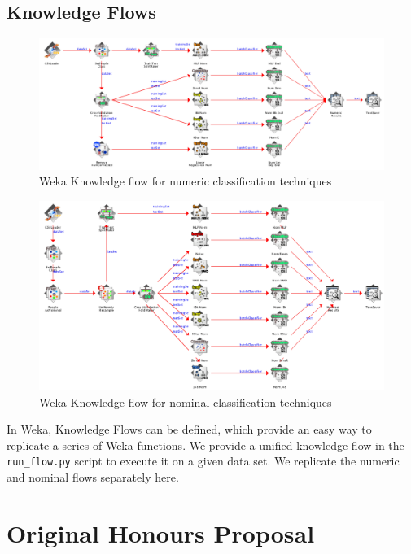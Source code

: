 \begin{landscape}
\chapter{Knowledge Flows}
\label{chap:knowledgeflows}

\begin{figure}[H]
\centering
\includegraphics[width=\linewidth]{../diagrams/knowledgeflow-numeric.png}
\caption{Weka Knowledge flow for numeric classification techniques}
\end{figure}
\end{landscape}

\begin{landscape}
\begin{figure}[H]
\centering
\includegraphics[width=\linewidth]{../diagrams/knowledgeflow-nominal.png}
\caption{Weka Knowledge flow for nominal classification techniques}
\end{figure}

In Weka, Knowledge Flows can be defined, which provide an easy way to replicate a series of Weka functions. We provide a unified knowledge flow in the \texttt{run\_flow.py} script to execute it on a given data set. We replicate the numeric and nominal flows separately here.
\end{landscape}

\chapter{Original Honours Proposal}
